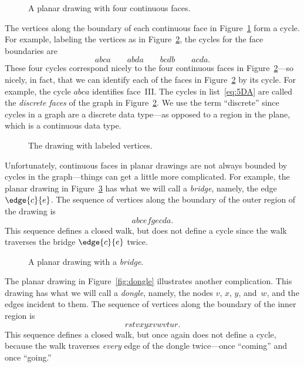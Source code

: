 \begin{figure}


\caption{A planar drawing with four continuous faces.}
\label{fig:continuous-faces}
\end{figure}

The vertices along the boundary of each continuous face in
Figure~\ref{fig:continuous-faces} form a cycle.  For example, labeling the
vertices as in Figure~\ref{fig:continuous-cycles}, the cycles for the face
boundaries are
\begin{equation}\label{eq:5DA}
abca \qquad abda \qquad bcdb \qquad acda.
\end{equation}
These four cycles correspond nicely to the four continuous faces in
Figure~\ref{fig:continuous-cycles}---so nicely, in fact, that we can
identify each of the faces in Figure~\ref{fig:continuous-cycles} by
its cycle.  For example, the cycle $abca$ identifies
face~III\@.  The cycles in list~\ref{eq:5DA} are called the
\emph{discrete faces} of the graph in
Figure~\ref{fig:continuous-cycles}.  We use the term ``discrete''
since cycles in a graph are a discrete data type---as opposed to a
region in the plane, which is a continuous data type.

\begin{figure}


\caption{The drawing with labeled vertices.}
\label{fig:continuous-cycles}
\end{figure}

Unfortunately, continuous faces in planar drawings are not always
bounded by cycles in the graph---things can get a little more
complicated.  For example, the planar drawing in
Figure~\ref{fig:bridge} has what we will call a \emph{bridge}, namely,
the edge $\edge{c}{e}$.  The sequence of vertices along the boundary
of the outer region of the drawing is
\[
abcefgecda.
\]
This sequence defines a closed walk, but does not define a cycle since
the walk traverses the bridge $\edge{c}{e}$ twice.

\begin{figure}


\caption{A planar drawing with a \emph{bridge}.}
\label{fig:bridge}
\end{figure}

The planar drawing in Figure~\ref{fig:dongle} illustrates another
complication.  This drawing has what we will call a \emph{dongle},
namely, the nodes $v$, $x$, $y$, and~$w$, and the edges incident to
them.  The sequence of vertices along the boundary
of the inner region is
\[
rstvxyxvwvtur.
\]
This sequence defines a closed walk, but once again does not define a
cycle, because the walk traverses \emph{every} edge of the dongle
twice---once ``coming'' and once ``going.''

